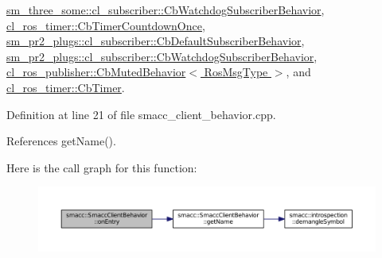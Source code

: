 \hyperlink{classsm__three__some_1_1cl__subscriber_1_1CbWatchdogSubscriberBehavior_a6bd938abf54a95555182345a5e53cafe}{sm\+\_\+three\+\_\+some\+::cl\+\_\+subscriber\+::\+Cb\+Watchdog\+Subscriber\+Behavior}, \hyperlink{classcl__ros__timer_1_1CbTimerCountdownOnce_a613662c4a4106ece0ce1dee198d1aba2}{cl\+\_\+ros\+\_\+timer\+::\+Cb\+Timer\+Countdown\+Once}, \hyperlink{classsm__pr2__plugs_1_1cl__subscriber_1_1CbDefaultSubscriberBehavior_ab4ac6d3ff4d7d919c12c35ce18c48990}{sm\+\_\+pr2\+\_\+plugs\+::cl\+\_\+subscriber\+::\+Cb\+Default\+Subscriber\+Behavior}, \hyperlink{classsm__pr2__plugs_1_1cl__subscriber_1_1CbWatchdogSubscriberBehavior_a15796d4cae539489a23fc0e444074158}{sm\+\_\+pr2\+\_\+plugs\+::cl\+\_\+subscriber\+::\+Cb\+Watchdog\+Subscriber\+Behavior}, \hyperlink{classcl__ros__publisher_1_1CbMutedBehavior_a79376d9160e3bd44678a2c0d89f1b4de}{cl\+\_\+ros\+\_\+publisher\+::\+Cb\+Muted\+Behavior$<$ Ros\+Msg\+Type $>$}, and \hyperlink{classcl__ros__timer_1_1CbTimer_aceba45e86271cf1b7333e2f42c246a38}{cl\+\_\+ros\+\_\+timer\+::\+Cb\+Timer}.



Definition at line 21 of file smacc\+\_\+client\+\_\+behavior.\+cpp.



References get\+Name().




Here is the call graph for this function\+:
\nopagebreak
\begin{figure}[H]
\begin{center}
\leavevmode
\includegraphics[width=350pt]{classsmacc_1_1SmaccClientBehavior_a7962382f93987c720ad432fef55b123f_cgraph}
\end{center}
\end{figure}


